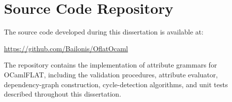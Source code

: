 \section{Source Code Repository}

The source code developed during this dissertation is available at:

\begin{center}
\url{https://github.com/Bailonis/OflatOcaml}
\end{center}

The repository contains the implementation of attribute grammars for OCamlFLAT, including the validation procedures, 
attribute evaluator, dependency-graph construction, cycle-detection algorithms, and unit tests described throughout this dissertation.


